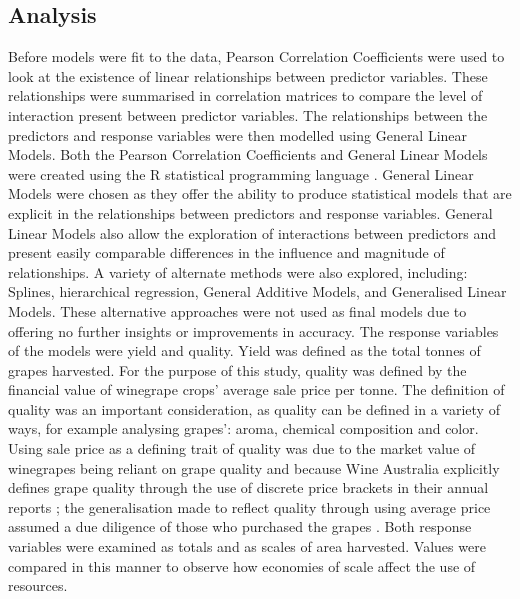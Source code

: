\documentclass[review,12pt,authoryear]{elsarticle}
\begin{document}
\begin{linenumbers}
\subsection{Analysis}
Before models were fit to the data, Pearson Correlation Coefficients were used to look at the existence of linear relationships between predictor variables. These relationships were summarised in correlation matrices to compare the level of interaction present between predictor variables. The relationships between the predictors and response variables were then modelled using General Linear Models. Both the Pearson Correlation Coefficients and General Linear Models were created using the R statistical programming language \citep{rcoreteamLanguageEnvironmentStatistical2021}. General Linear Models were chosen as they offer the ability to produce statistical models that are explicit in the relationships between predictors and response variables.
General Linear Models also allow the exploration of interactions between predictors and present easily comparable differences in the influence and magnitude of relationships.
 A variety of alternate methods were also explored, including: Splines, hierarchical regression, General Additive Models, and Generalised Linear Models. These alternative approaches were not used as final models due to offering no further insights or improvements in accuracy.
\newline
The response variables of the models were yield and quality. Yield was defined as the total tonnes of grapes harvested. For the purpose of this study, quality was defined by the financial value of winegrape crops' average sale price per tonne. The definition of quality was an important consideration, as quality can be defined in a variety of ways, for example analysing grapes': aroma, chemical composition and color.
Using sale price as a defining trait of quality was due to the market value of winegrapes being reliant on grape quality and because Wine Australia explicitly defines grape quality through the use of discrete price brackets in their annual reports
; the generalisation made to reflect quality through using average price assumed a due diligence of those who purchased the grapes \citep{yeggeInfluenceSensoryNonsensory2001}.  Both response variables were examined as totals and as scales of area harvested. Values were compared in this manner to observe how economies of scale affect the use of resources.
%
%
%

\end{linenumbers}
\end{document}
